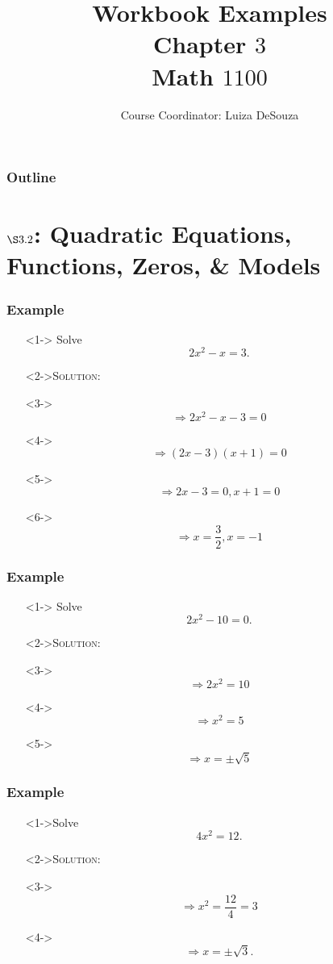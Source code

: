 \documentclass[handout]{beamer}
\title{Workbook Examples \\ Chapter $3$ \\ Math $1100$}
\author{Course Coordinator: Luiza DeSouza}
\date{\datefmt{\year}{\month}{\day}}
\begin{document}
\begin{frame}
	\titlepage
\end{frame}

\begin{frame}
	\frametitle{Outline}
	\tableofcontents
\end{frame}

\section{$\S 3.2$: Quadratic Equations, Functions, Zeros, \& Models}

\begin{frame}
	\frametitle{Example}
	\begin{enumerate}
		\item[]<1-> Solve \[ 2x^{2}-x=3. \]
		\item[]<2->\textsc{Solution:}
		\item[]<3-> \[ \Rightarrow 2x^{2}-x-3=0 \]
		\item[]<4->\[ \Rightarrow (2x-3)(x+1)=0 \]
		\item[]<5->\[ \Rightarrow 2x-3=0, x+1=0 \]
		\item[]<6->\[ \Rightarrow x=\frac{3}{2}, x=-1\]
	\end{enumerate}
\end{frame}

\begin{frame}
	\frametitle{Example}
	\begin{enumerate}
		\item[]<1-> Solve \[ 2x^{2}-10=0. \]
		\item[]<2->\textsc{Solution:}
		\item[]<3->\[ \Rightarrow 2x^{2}=10\]
		\item[]<4->\[\Rightarrow x^{2}=5\]
		\item[]<5->\[ \Rightarrow x=\pm \sqrt{5} \]
	\end{enumerate}
\end{frame}

\begin{frame}
	\frametitle{Example}
	\begin{enumerate}
		\item[]<1->Solve \[ 4x^{2}=12. \]
		\item[]<2->\textsc{Solution:}
		\item[]<3-> \[ \Rightarrow x^{2}=\frac{12}{4}=3 \]
		\item[]<4->\[ \Rightarrow x=\pm \sqrt{3}. \]
	\end{enumerate}
\end{frame}
\end{document}
